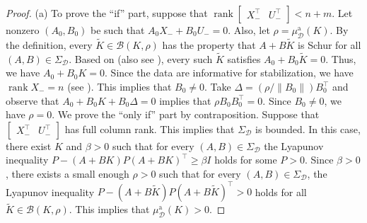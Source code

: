\documentclass[9pt,shortpaper,twoside,web]{ieeecolor}
\DeclareMathOperator{\rank}{rank}
\begin{document}
\begin{proof}
(a) To prove the ``if'' part, suppose that $\rank\begin{bmatrix}X_-^\top & U_-^\top\end{bmatrix}<n+m$. Let nonzero $(A_0,B_0)$ be such that $A_0X_-+B_0U_-=0$. Also, let $\rho=\mu_\mathcal{D}^\text{a}(K)$. By the definition, every $\tilde{K}\in\mathcal{B}(K,\rho)$ has the property that $A+B\tilde{K}$ is Schur for all $(A,B)\in\Sigma_\mathcal{D}$. Based on \cite[eq. (27)]{HenkSlemma} (also see \cite[Lem. 15]{van2020data}), every such $\tilde{K}$ satisfies $A_0+B_0 \tilde{K}=0$. Thus, we have $A_0+B_0 K=0$. Since the data are informative for stabilization, we have $\rank X_-=n$ (see \mbox{\cite[Thm. 16]{van2020data}}). This implies that $B_0\neq 0$. Take $\Delta=(\rho/\|B_0\|) B_0^\top$ and observe that $A_0+B_0 K+B_0\Delta=0$ implies that $\rho B_0B_0^\top=0$. Since $B_0\neq 0$, we have $\rho=0$. We prove the ``only if'' part by contraposition. Suppose that $\begin{bmatrix}X_-^\top & U_-^\top\end{bmatrix}$ has full column rank. This implies that $\Sigma_\mathcal{D}$ is bounded. In this case, there exist $K$ and $\beta>0$ such that for every $(A,B)\in\Sigma_\mathcal{D}$ the Lyapunov inequality $P-(A+BK)P(A+BK)^\top \geq \beta I$ holds for some $P>0$. Since $\beta>0$, there exists a small enough $\rho>0$ such that for every $(A,B)\in\Sigma_\mathcal{D}$, the Lyapunov inequality $P-(A+B\tilde{K})P(A+B\tilde{K})^\top> 0$ holds for all $\tilde{K}\in\mathcal{B}(K,\rho)$. This implies that $\mu_{\mathcal{D}}^{\text{a}}(K)>0$. 


\end{proof}
\end{document}
